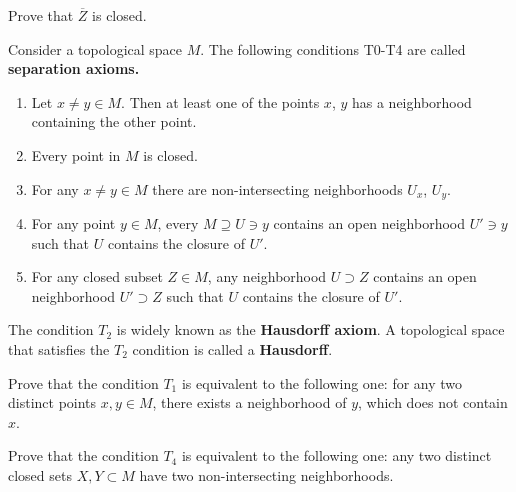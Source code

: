 \documentclass[12pt]{article}
\begin{document}
\begin{zadacha}
Prove that $\overline Z$ is closed.
\end{zadacha}

\begin{opredelenie}
Consider a topological space $M$. The following conditions T0-T4
are called {\bf separation axioms.}
\begin{enumerate}
\renewcommand{\labelenumi}{{\bf T\arabic{enumi}.}}
\setcounter{enumi}{-1}
\item Let $x\neq y \in M$. Then at least one of
  the points $x$, $y$ has a neighborhood  containing the other point.

\item Every point in $M$ is closed.

\item For any $x\neq y\in M$ there are non-intersecting
  neighborhoods $U_x$, $U_y$.

\item For any point $y\in M$, every $M\supseteq U\ni y$ contains an
  open neighborhood $U'\ni y$ such that $U$ contains the closure of
  $U'$.

\item For any closed subset $Z\in M$, any neighborhood
$U\supset Z$ contains an open neighborhood $U'\supset Z$ such that
$U$ contains the closure of $U'$.
\end{enumerate}
The condition $T_2$ is widely known as the {\bf Hausdorff
  axiom}. A topological space that satisfies the $T_2$ condition is
called a {\bf Hausdorff}.
\end{opredelenie}

\begin{zadacha}
  Prove that the condition $T_1$ is equivalent to the following one:
  for any two distinct points $x, y\in M$, there exists a
  neighborhood of $y$, which does not contain $x$.
\end{zadacha}

\begin{zadacha}
Prove that the condition $T_4$ is equivalent to the following one: any
two distinct closed sets $X, Y\subset M$ have two non-intersecting
neighborhoods.
\end{zadacha}
\end{document}
